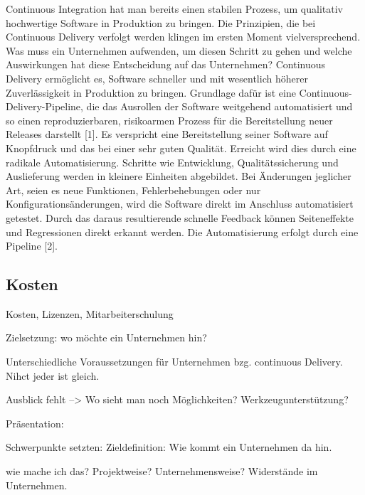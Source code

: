  Continuous Integration hat man bereits einen stabilen Prozess, um qualitativ hochwertige Software in Produktion zu bringen. Die Prinzipien, die bei Continuous Delivery verfolgt werden klingen im ersten Moment vielversprechend. Was muss ein Unternehmen aufwenden, um diesen Schritt zu gehen und welche Auswirkungen hat diese Entscheidung auf das Unternehmen? 
Continuous Delivery ermöglicht es, Software schneller und mit wesentlich höherer Zuverlässigkeit in Produktion zu bringen. Grundlage dafür ist eine Continuous-Delivery-Pipeline, die das Ausrollen der Software weitgehend automatisiert und so einen reproduzierbaren, risikoarmen Prozess für die Bereitstellung neuer Releases darstellt [1]. Es verspricht eine Bereitstellung seiner Software auf Knopfdruck und das bei einer sehr guten Qualität. Erreicht wird dies durch eine radikale Automatisierung. Schritte wie Entwicklung, Qualitätssicherung und Auslieferung werden in kleinere Einheiten abgebildet. Bei Änderungen jeglicher Art, seien es neue Funktionen, Fehlerbehebungen oder nur Konfigurationsänderungen, wird die Software direkt im Anschluss automatisiert getestet. Durch das daraus resultierende schnelle Feedback können Seiteneffekte und Regressionen direkt erkannt werden. Die Automatisierung erfolgt durch eine Pipeline [2]. 

\subsection{Kosten}
Kosten, Lizenzen, Mitarbeiterschulung

Zielsetzung: wo möchte ein Unternehmen hin?

Unterschiedliche Voraussetzungen für Unternehmen bzg. continuous Delivery. Nihct jeder ist gleich.


Ausblick fehlt --> Wo sieht man noch Möglichkeiten? Werkzeugunterstützung?

Präsentation: 

Schwerpunkte setzten: Zieldefinition: Wie kommt ein Unternehmen da hin.

wie mache ich das? Projektweise? Unternehmensweise? 
Widerstände im Unternehmen.

